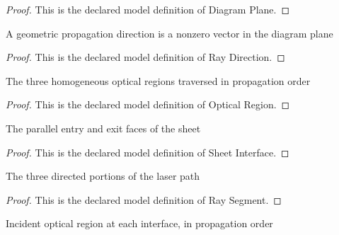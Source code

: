 \begin{proof}
  This is the declared model definition of Diagram Plane.
\end{proof}
\begin{definition}
  \label{def:physics:phyx-mini-0049:phyxminiproblems-problemphyxmini0049-raydirection}
  A geometric propagation direction is a nonzero vector in the diagram plane
\end{definition}
\begin{proof}
  This is the declared model definition of Ray Direction.
\end{proof}
\begin{definition}
  \label{def:physics:phyx-mini-0049:phyxminiproblems-problemphyxmini0049-opticalregion}
  The three homogeneous optical regions traversed in propagation order
\end{definition}
\begin{proof}
  This is the declared model definition of Optical Region.
\end{proof}
\begin{definition}
  \label{def:physics:phyx-mini-0049:phyxminiproblems-problemphyxmini0049-sheetinterface}
  The parallel entry and exit faces of the sheet
\end{definition}
\begin{proof}
  This is the declared model definition of Sheet Interface.
\end{proof}
\begin{definition}
  \label{def:physics:phyx-mini-0049:phyxminiproblems-problemphyxmini0049-raysegment}
  The three directed portions of the laser path
\end{definition}
\begin{proof}
  This is the declared model definition of Ray Segment.
\end{proof}
\begin{definition}
  \label{def:physics:phyx-mini-0049:phyxminiproblems-problemphyxmini0049-incidentregion}
  Incident optical region at each interface, in propagation order
\end{definition}
